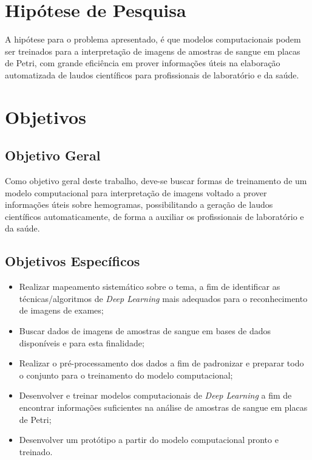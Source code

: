 \section{Hipótese de Pesquisa}
\label{sec:hipotese}

A hipótese para o problema apresentado, é que modelos computacionais podem ser treinados para a interpretação de imagens de amostras de sangue em placas de Petri, com grande eficiência em prover informações úteis na elaboração automatizada de laudos científicos para profissionais de laboratório e da saúde.


\section{Objetivos}
\label{sec:objetivos}

\subsection{Objetivo Geral}
Como objetivo geral deste trabalho, deve-se buscar formas de treinamento de um modelo computacional para interpretação de imagens voltado a prover informações úteis sobre hemogramas, possibilitando a geração de laudos científicos automaticamente, de forma a auxiliar os profissionais de laboratório e da saúde.


\subsection{Objetivos Específicos}
\begin{itemize}
	\item Realizar mapeamento sistemático sobre o tema, a fim de identificar as técnicas/algoritmos de \emph{Deep Learning} mais adequados para o reconhecimento de imagens de exames;
	\item Buscar dados de imagens de amostras de sangue em bases de dados disponíveis e para esta finalidade;
	\item Realizar o pré-processamento dos dados a fim de padronizar e preparar todo o conjunto para o treinamento do modelo computacional;
	\item Desenvolver e treinar modelos computacionais de \emph{Deep Learning} a fim de encontrar informações suficientes na análise de amostras de sangue em placas de Petri;
	\item Desenvolver um protótipo a partir do modelo computacional pronto e treinado.
\end{itemize}

